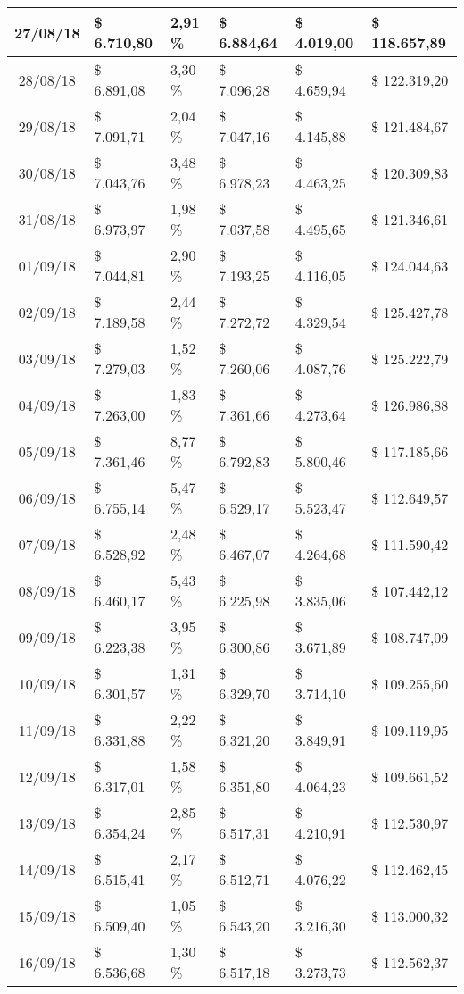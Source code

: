 \begin{small}
\begin{longtable}{|c|l|l|l|l|l|}
27/08/18 & \$ 6.710,80 & 2,91 \% & \$ 6.884,64 & \$ 4.019,00 & \$ 118.657,89 \\ \hline
28/08/18 & \$ 6.891,08 & 3,30 \% & \$ 7.096,28 & \$ 4.659,94 & \$ 122.319,20 \\ \hline
29/08/18 & \$ 7.091,71 & 2,04 \% & \$ 7.047,16 & \$ 4.145,88 & \$ 121.484,67 \\ \hline
30/08/18 & \$ 7.043,76 & 3,48 \% & \$ 6.978,23 & \$ 4.463,25 & \$ 120.309,83 \\ \hline
31/08/18 & \$ 6.973,97 & 1,98 \% & \$ 7.037,58 & \$ 4.495,65 & \$ 121.346,61 \\ \hline
01/09/18 & \$ 7.044,81 & 2,90 \% & \$ 7.193,25 & \$ 4.116,05 & \$ 124.044,63 \\ \hline
02/09/18 & \$ 7.189,58 & 2,44 \% & \$ 7.272,72 & \$ 4.329,54 & \$ 125.427,78 \\ \hline
03/09/18 & \$ 7.279,03 & 1,52 \% & \$ 7.260,06 & \$ 4.087,76 & \$ 125.222,79 \\ \hline
04/09/18 & \$ 7.263,00 & 1,83 \% & \$ 7.361,66 & \$ 4.273,64 & \$ 126.986,88 \\ \hline
05/09/18 & \$ 7.361,46 & 8,77 \% & \$ 6.792,83 & \$ 5.800,46 & \$ 117.185,66 \\ \hline
06/09/18 & \$ 6.755,14 & 5,47 \% & \$ 6.529,17 & \$ 5.523,47 & \$ 112.649,57 \\ \hline
07/09/18 & \$ 6.528,92 & 2,48 \% & \$ 6.467,07 & \$ 4.264,68 & \$ 111.590,42 \\ \hline
08/09/18 & \$ 6.460,17 & 5,43 \% & \$ 6.225,98 & \$ 3.835,06 & \$ 107.442,12 \\ \hline
09/09/18 & \$ 6.223,38 & 3,95 \% & \$ 6.300,86 & \$ 3.671,89 & \$ 108.747,09 \\ \hline
10/09/18 & \$ 6.301,57 & 1,31 \% & \$ 6.329,70 & \$ 3.714,10 & \$ 109.255,60 \\ \hline
11/09/18 & \$ 6.331,88 & 2,22 \% & \$ 6.321,20 & \$ 3.849,91 & \$ 109.119,95 \\ \hline
12/09/18 & \$ 6.317,01 & 1,58 \% & \$ 6.351,80 & \$ 4.064,23 & \$ 109.661,52 \\ \hline
13/09/18 & \$ 6.354,24 & 2,85 \% & \$ 6.517,31 & \$ 4.210,91 & \$ 112.530,97 \\ \hline
14/09/18 & \$ 6.515,41 & 2,17 \% & \$ 6.512,71 & \$ 4.076,22 & \$ 112.462,45 \\ \hline
15/09/18 & \$ 6.509,40 & 1,05 \% & \$ 6.543,20 & \$ 3.216,30 & \$ 113.000,32 \\ \hline
16/09/18 & \$ 6.536,68 & 1,30 \% & \$ 6.517,18 & \$ 3.273,73 & \$ 112.562,37 \\ \hline

\end{longtable}
\end{small}
